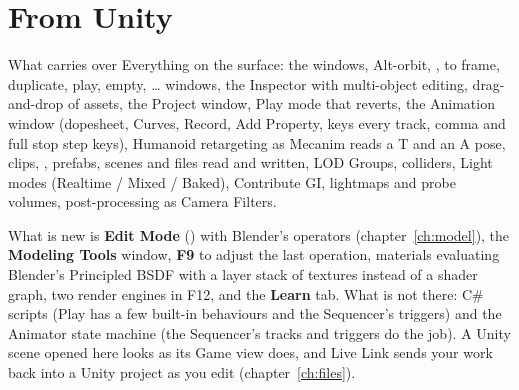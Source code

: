 \section{From Unity}
\begin{fromnote}{What carries over}
Everything on the surface: the windows, Alt-orbit, ,  to frame,  duplicate, 
play,  empty, \ldots{} windows, the Inspector with multi-object editing, drag-and-drop of
assets, the Project window, Play mode that reverts, the Animation window (dopesheet, Curves, Record, Add Property,
 keys every track, comma and full stop step keys), Humanoid retargeting as Mecanim reads a T and an A pose,
 clips, , prefabs, scenes and  files read and written, LOD Groups, colliders,
Light modes (Realtime / Mixed / Baked), Contribute GI, lightmaps and probe volumes, post-processing as Camera Filters.
\end{fromnote}
What is new is \textbf{Edit Mode} () with Blender's operators (chapter~\ref{ch:model}), the \textbf{Modeling
Tools} window, \textbf{F9} to adjust the last operation, materials evaluating Blender's Principled BSDF with a layer
stack of textures instead of a shader graph, two render engines in F12, and the \textbf{Learn} tab. What is not there:
C\# scripts (Play has a few built-in behaviours and the Sequencer's triggers) and the Animator state machine (the
Sequencer's tracks and triggers do the job). A Unity scene opened here looks as its Game view does, and Live Link sends
your work back into a Unity project as you edit (chapter~\ref{ch:files}).

